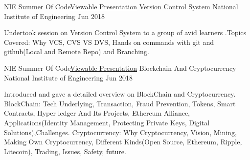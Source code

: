 

\begin{cventries}
\cventry
    {NIE Summer Of Code\quad\textbar\quad \href{https://goo.gl/767dBZ}{Viewable Presentation}}%
    {Version Control System} %
    {National Institute of Engineering} %
    {Jun 2018} %
    {
      \begin{cvitems} %
        \item {Undertook session on Version Control System to a group of avid learners .\newline{}Topics Covered: Why VCS, CVS VS DVS, Hands on commands with git and github(Local and Remote Repo) and Branching.}
      \end{cvitems}
    }

\end{cventries}



  \cventry
    {NIE Summer Of Code\quad\textbar\quad \href{https://goo.gl/TEFiwH}{Viewable Presentation}}  %
    {Blockchain And Cryptocurrency} %
    {National Institute of Engineering} %
    {Jun 2018} %
    {
      \begin{cvitems} %
        \item {Introduced and gave a detailed overview on BlockChain and Cryptocurrency.
\newline{}BlockChain: Tech Underlying, Transaction, Fraud Prevention, Tokens, Smart Contracts, Hyper ledger And Its Projects, Ethereum Alliance, Applications(Identity Management, Protecting Private Keys, Digital Solutions),Challenges.
\newline{}Cryptocurrency: Why Cryptocurrency, Vision, Mining, Making Own Cryptocurrency, Different Kinds(Open Source, Ethereum, Ripple, Litecoin), Trading, Issues, Safety, future.
}
      \end{cvitems}
    }

  